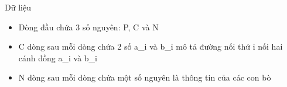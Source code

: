 Dữ liệu
\begin{itemize}
	\item     Dòng đầu chứa 3 số nguyên: P, C và N   
	\item     C dòng sau mỗi dòng chứa 2 số a\_i và b\_i mô tả đường nối thứ i nối hai cánh đồng a\_i và b\_i   
	\item     N dòng sau mỗi dòng chứa một số nguyên là thông tin của các con bò   
\end{itemize}